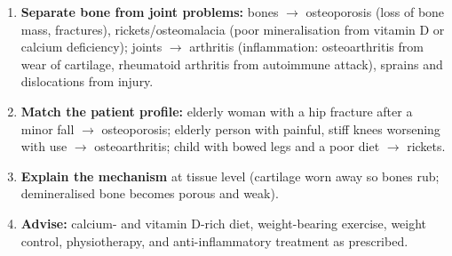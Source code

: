 \documentclass[11pt]{article}
\begin{document}
\begin{methode}
\begin{enumerate}
\item \textbf{Separate bone from joint problems:} bones $\rightarrow$ osteoporosis (loss of bone mass, fractures), rickets/osteomalacia (poor mineralisation from vitamin D or calcium deficiency); joints $\rightarrow$ arthritis (inflammation: osteoarthritis from wear of cartilage, rheumatoid arthritis from autoimmune attack), sprains and dislocations from injury.
\item \textbf{Match the patient profile:} elderly woman with a hip fracture after a minor fall $\rightarrow$ osteoporosis; elderly person with painful, stiff knees worsening with use $\rightarrow$ osteoarthritis; child with bowed legs and a poor diet $\rightarrow$ rickets.
\item \textbf{Explain the mechanism} at tissue level (cartilage worn away so bones rub; demineralised bone becomes porous and weak).
\item \textbf{Advise:} calcium- and vitamin D-rich diet, weight-bearing exercise, weight control, physiotherapy, and anti-inflammatory treatment as prescribed.
\end{enumerate}
\end{methode}
\end{document}
